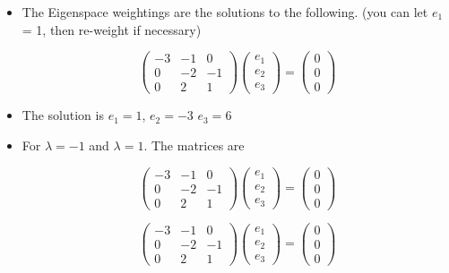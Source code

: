 \documentclass[12pt, a4paper]{report}
\begin{document}
{\newpage
{\Large
\begin{itemize}
\item The Eigenspace weightings are the solutions to the following. (you can let $e_1$ = 1, then re-weight if necessary)

\[\left(\begin{array}{ccc}
-3 & -1 & 0 \\
0 & -2 & -1 \\
0 & 2 & 1
\end{array} \right)
\left(\begin{array}{c}
e_1 \\
e_2 \\
e_3
\end{array} \right) = \left(\begin{array}{c}
0 \\
0 \\
0
\end{array} \right)\]
\item The solution is $e_1=1$, $e_2=-3$ $e_3=6$

\item For $\lambda =-1$ and $\lambda =1$. The matrices are

\[\left(\begin{array}{ccc}
-3 & -1 & 0 \\
0 & -2 & -1 \\
0 & 2 & 1
\end{array} \right) \left(\begin{array}{c}
e_1 \\
e_2 \\
e_3
\end{array} \right) = \left(\begin{array}{c}
0 \\
0 \\
0
\end{array} \right)\]

\[
\left(\begin{array}{ccc}
-3 & -1 & 0 \\
0 & -2 & -1 \\
0 & 2 & 1
\end{array} \right)\left(\begin{array}{c}
e_1 \\
e_2 \\
e_3
\end{array} \right) = \left(\begin{array}{c}
0 \\
0 \\
0
\end{array} \right)\]


\end{itemize}}}
\end{document}
